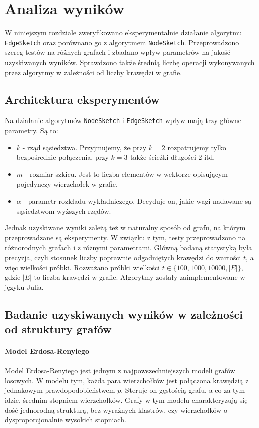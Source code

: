 \chapter{Analiza wyników}

    W niniejszym rozdziale zweryfikowano eksperymentalnie działanie algorytmu \texttt{EdgeSketch} oraz porównano go z algorytmem \texttt{NodeSketch}. Przeprowadzono szereg testów na różnych grafach i zbadano wpływ parametrów na jakość uzyskiwanych wyników. Sprawdzono także średnią liczbę operacji wykonywanych przez algorytmy w zależności od liczby krawędzi w grafie.

\section{Architektura eksperymentów}

    Na działanie algorytmów \texttt{NodeSketch} i \texttt{EdgeSketch} wpływ mają trzy główne parametry. Są to:
    \begin{itemize}
        \item $k$ - rząd sąsiedztwa. Przyjmujemy, że przy $k = 2$ rozpatrujemy tylko bezpośrednie połączenia, przy $k = 3$ także ścieżki długości $2$ itd. 
        \item $m$ - rozmiar szkicu. Jest to liczba elementów w wektorze opisującym pojedynczy wierzchołek w grafie. 
        \item $\alpha$ - parametr rozkładu wykładniczego. Decyduje on, jakie wagi nadawane są sąsiedztwom wyższych rzędów.
    \end{itemize}

    Jednak uzyskiwane wyniki zależą też w naturalny sposób od grafu, na którym przeprowadzane są eksperymenty. W związku z tym, testy przeprowadzono na różnorodnych grafach i z różnymi parametrami. Główną badaną statystyką była precyzja, czyli stosunek liczby poprawnie odgadniętych krawędzi do wartości $t$, a więc wielkości próbki. Rozważano próbki wielkości $t \in \{100, 1000, 10000, |E|\}$, gdzie $|E|$ to liczba krawędzi w grafie. Algorytmy zostały zaimplementowane w języku Julia\cite{Julia}.

\section{Badanie uzyskiwanych wyników w zależności od struktury grafów}

    \subsubsection{Model Erdosa-Renyiego}
        Model Erdosa-Renyiego jest jednym z najpowszechniejszych modeli grafów losowych. W modelu tym, każda para wierzchołków jest połączona krawędzią z jednakowym prawdopodobieństwem $p$. Steruje on gęstością grafu, a co za tym idzie, średnim stopniem wierzchołków. Grafy w tym modelu charakteryzują się dość jednorodną strukturą, bez wyraźnych klastrów, czy wierzchołków o dysproporcjonalnie wysokich stopniach. 

